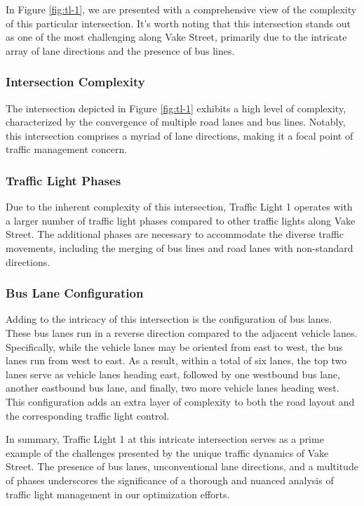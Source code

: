 In Figure \ref{fig:tl-1}, we are presented with a comprehensive view of the complexity of this particular intersection. It's worth noting that this intersection stands out as one of the most challenging along Vake Street, primarily due to the intricate array of lane directions and the presence of bus lines.

\subsubsection{Intersection Complexity}
The intersection depicted in Figure \ref{fig:tl-1} exhibits a high level of complexity, characterized by the convergence of multiple road lanes and bus lines. Notably, this intersection comprises a myriad of lane directions, making it a focal point of traffic management concern.

\subsubsection{Traffic Light Phases}
Due to the inherent complexity of this intersection, Traffic Light 1 operates with a larger number of traffic light phases compared to other traffic lights along Vake Street. The additional phases are necessary to accommodate the diverse traffic movements, including the merging of bus lines and road lanes with non-standard directions.

\subsubsection{Bus Lane Configuration}
Adding to the intricacy of this intersection is the configuration of bus lanes. These bus lanes run in a reverse direction compared to the adjacent vehicle lanes. Specifically, while the vehicle lanes may be oriented from east to west, the bus lanes run from west to east. As a result, within a total of six lanes, the top two lanes serve as vehicle lanes heading east, followed by one westbound bus lane, another eastbound bus lane, and finally, two more vehicle lanes heading west. This configuration adds an extra layer of complexity to both the road layout and the corresponding traffic light control.

In summary, Traffic Light 1 at this intricate intersection serves as a prime example of the challenges presented by the unique traffic dynamics of Vake Street. The presence of bus lanes, unconventional lane directions, and a multitude of phases underscores the significance of a thorough and nuanced analysis of traffic light management in our optimization efforts.

